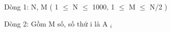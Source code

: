 Dòng 1: N, M ( 1  $\le$  N  $\le$  1000, 1  $\le$  M  $\le$  N/2 )  

   Dòng 2: Gồm M số, số  thứ  i  là   A   $_    i   $